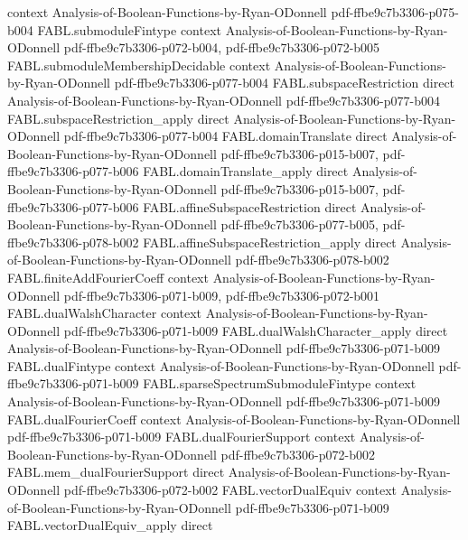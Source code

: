 \begin{theorem}
  {context}
  {Analysis-of-Boolean-Functions-by-Ryan-ODonnell}
  {pdf-ffbe9c7b3306-p075-b004}
\proofstep
  {FABL.submoduleFintype}
  {context}
  {Analysis-of-Boolean-Functions-by-Ryan-ODonnell}
  {pdf-ffbe9c7b3306-p072-b004,
    pdf-ffbe9c7b3306-p072-b005}
\proofstep
  {FABL.submoduleMembershipDecidable}
  {context}
  {Analysis-of-Boolean-Functions-by-Ryan-ODonnell}
  {pdf-ffbe9c7b3306-p077-b004}
\proofstep
  {FABL.subspaceRestriction}
  {direct}
  {Analysis-of-Boolean-Functions-by-Ryan-ODonnell}
  {pdf-ffbe9c7b3306-p077-b004}
\proofstep
  {FABL.subspaceRestriction_apply}
  {direct}
  {Analysis-of-Boolean-Functions-by-Ryan-ODonnell}
  {pdf-ffbe9c7b3306-p077-b004}
\proofstep
  {FABL.domainTranslate}
  {direct}
  {Analysis-of-Boolean-Functions-by-Ryan-ODonnell}
  {pdf-ffbe9c7b3306-p015-b007,
    pdf-ffbe9c7b3306-p077-b006}
\proofstep
  {FABL.domainTranslate_apply}
  {direct}
  {Analysis-of-Boolean-Functions-by-Ryan-ODonnell}
  {pdf-ffbe9c7b3306-p015-b007,
    pdf-ffbe9c7b3306-p077-b006}
\proofstep
  {FABL.affineSubspaceRestriction}
  {direct}
  {Analysis-of-Boolean-Functions-by-Ryan-ODonnell}
  {pdf-ffbe9c7b3306-p077-b005,
    pdf-ffbe9c7b3306-p078-b002}
\proofstep
  {FABL.affineSubspaceRestriction_apply}
  {direct}
  {Analysis-of-Boolean-Functions-by-Ryan-ODonnell}
  {pdf-ffbe9c7b3306-p078-b002}
\proofstep
  {FABL.finiteAddFourierCoeff}
  {context}
  {Analysis-of-Boolean-Functions-by-Ryan-ODonnell}
  {pdf-ffbe9c7b3306-p071-b009,
    pdf-ffbe9c7b3306-p072-b001}
\proofstep
  {FABL.dualWalshCharacter}
  {context}
  {Analysis-of-Boolean-Functions-by-Ryan-ODonnell}
  {pdf-ffbe9c7b3306-p071-b009}
\proofstep
  {FABL.dualWalshCharacter_apply}
  {direct}
  {Analysis-of-Boolean-Functions-by-Ryan-ODonnell}
  {pdf-ffbe9c7b3306-p071-b009}
\proofstep
  {FABL.dualFintype}
  {context}
  {Analysis-of-Boolean-Functions-by-Ryan-ODonnell}
  {pdf-ffbe9c7b3306-p071-b009}
\proofstep
  {FABL.sparseSpectrumSubmoduleFintype}
  {context}
  {Analysis-of-Boolean-Functions-by-Ryan-ODonnell}
  {pdf-ffbe9c7b3306-p071-b009}
\proofstep
  {FABL.dualFourierCoeff}
  {context}
  {Analysis-of-Boolean-Functions-by-Ryan-ODonnell}
  {pdf-ffbe9c7b3306-p071-b009}
\proofstep
  {FABL.dualFourierSupport}
  {context}
  {Analysis-of-Boolean-Functions-by-Ryan-ODonnell}
  {pdf-ffbe9c7b3306-p072-b002}
\proofstep
  {FABL.mem_dualFourierSupport}
  {direct}
  {Analysis-of-Boolean-Functions-by-Ryan-ODonnell}
  {pdf-ffbe9c7b3306-p072-b002}
\proofstep
  {FABL.vectorDualEquiv}
  {context}
  {Analysis-of-Boolean-Functions-by-Ryan-ODonnell}
  {pdf-ffbe9c7b3306-p071-b009}
\proofstep
  {FABL.vectorDualEquiv_apply}
  {direct}

\end{theorem}

